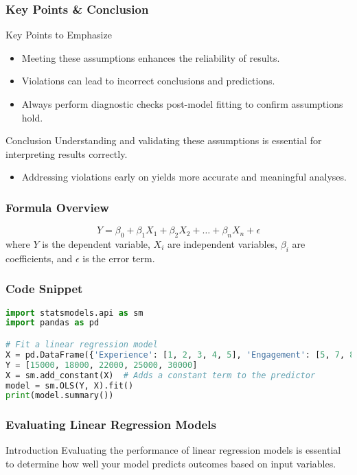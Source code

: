 \documentclass[aspectratio=169]{beamer}
\begin{document}
\begin{frame}[fragile]
    \frametitle{Key Points & Conclusion}
    \begin{block}{Key Points to Emphasize}
        \begin{itemize}
            \item Meeting these assumptions enhances the reliability of results.
            \item Violations can lead to incorrect conclusions and predictions.
            \item Always perform diagnostic checks post-model fitting to confirm assumptions hold.
        \end{itemize}
    \end{block}

    \begin{block}{Conclusion}
        Understanding and validating these assumptions is essential for interpreting results correctly.
        \begin{itemize}
            \item Addressing violations early on yields more accurate and meaningful analyses.
        \end{itemize}
    \end{block}
\end{frame}

\begin{frame}[fragile]
    \frametitle{Formula Overview}
    \begin{equation}
        Y = \beta_0 + \beta_1X_1 + \beta_2X_2 + \ldots + \beta_nX_n + \epsilon
    \end{equation}
    where \(Y\) is the dependent variable, \(X_i\) are independent variables, \(\beta_i\) are coefficients, and \(\epsilon\) is the error term.
\end{frame}

\begin{frame}[fragile]
    \frametitle{Code Snippet}
    \begin{lstlisting}[language=Python]
import statsmodels.api as sm
import pandas as pd

# Fit a linear regression model
X = pd.DataFrame({'Experience': [1, 2, 3, 4, 5], 'Engagement': [5, 7, 8, 9, 10]})
Y = [15000, 18000, 22000, 25000, 30000]
X = sm.add_constant(X)  # Adds a constant term to the predictor
model = sm.OLS(Y, X).fit()
print(model.summary())
    \end{lstlisting}
\end{frame}

\begin{frame}
    \frametitle{Evaluating Linear Regression Models}
    \begin{block}{Introduction}
        Evaluating the performance of linear regression models is essential to determine how well your model predicts outcomes based on input variables. 
    \end{block}
\end{frame}
\end{document}
